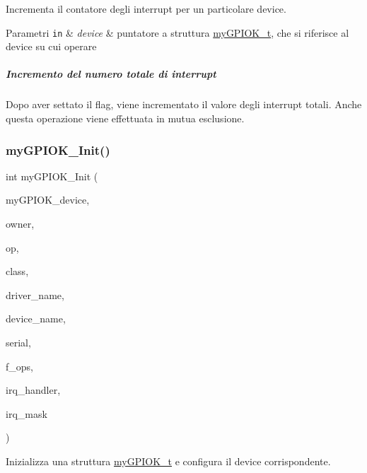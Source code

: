 Incrementa il contatore degli interrupt per un particolare device. 


\begin{DoxyParams}[1]{Parametri}
\mbox{\tt in}  & {\em device} & puntatore a struttura \hyperlink{structmy_g_p_i_o_k__t}{my\+G\+P\+I\+O\+K\+\_\+t}, che si riferisce al device su cui operare\\
\hline
\end{DoxyParams}
\subparagraph*{Incremento del numero totale di interrupt}

Dopo aver settato il flag, viene incrementato il valore degli interrupt totali. Anche questa operazione viene effettuata in mutua esclusione. \mbox{\label{group__my_g_p_i_o_k__t_ga64afb2eff1f990814d792349842c522d}} 
\subsubsection{\texorpdfstring{my\+G\+P\+I\+O\+K\+\_\+\+Init()}{myGPIOK\_Init()}}
{\footnotesize\ttfamily int my\+G\+P\+I\+O\+K\+\_\+\+Init (\begin{DoxyParamCaption}\item[{\hyperlink{structmy_g_p_i_o_k__t}{my\+G\+P\+I\+O\+K\+\_\+t} $\ast$}]{my\+G\+P\+I\+O\+K\+\_\+device,  }\item[{struct module $\ast$}]{owner,  }\item[{struct platform\+\_\+device $\ast$}]{op,  }\item[{struct class $\ast$}]{class,  }\item[{const char $\ast$}]{driver\+\_\+name,  }\item[{const char $\ast$}]{device\+\_\+name,  }\item[{uint32\+\_\+t}]{serial,  }\item[{struct file\+\_\+operations $\ast$}]{f\+\_\+ops,  }\item[{irq\+\_\+handler\+\_\+t}]{irq\+\_\+handler,  }\item[{uint32\+\_\+t}]{irq\+\_\+mask }\end{DoxyParamCaption})}



Inizializza una struttura \hyperlink{structmy_g_p_i_o_k__t}{my\+G\+P\+I\+O\+K\+\_\+t} e configura il device corrispondente. 


